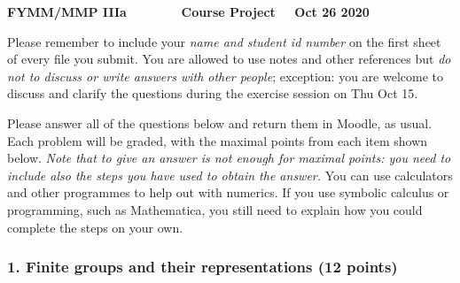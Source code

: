 \documentclass[12pt]{article}
\newcommand{\defem}[1]{{\em #1\/}}
\begin{document}
\normalsize

\baselineskip 14pt

\begin{center}
{\Large {\bf FYMM/MMP IIIa \ \ \ \ \ \ \ Course Project \ \  Oct 26 2020}}
\end{center}

\bigskip

Please remember to include your {\it name and student id number\/} on the first sheet of every file you 
submit.  You are allowed to use notes and other references but {\it do not to discuss or write answers with other people}; exception: you are welcome to discuss and clarify the questions during the exercise session on Thu Oct 15.

Please answer all of the questions below and return them in Moodle, as usual. Each problem will be graded, with the maximal points from each item shown below.  \defem{Note that to give an answer is not enough for maximal points: you need to include also the steps you have used to obtain the answer.}
You can use calculators and other programmes to help out with numerics.  If you use symbolic calculus or programming, such as Mathematica, you still need to explain how you could complete the steps on your own.

\enlargethispage*{2cm}
\pagestyle{empty}

\subsubsection*{1. Finite groups and their representations (12 points)}
\end{document}

